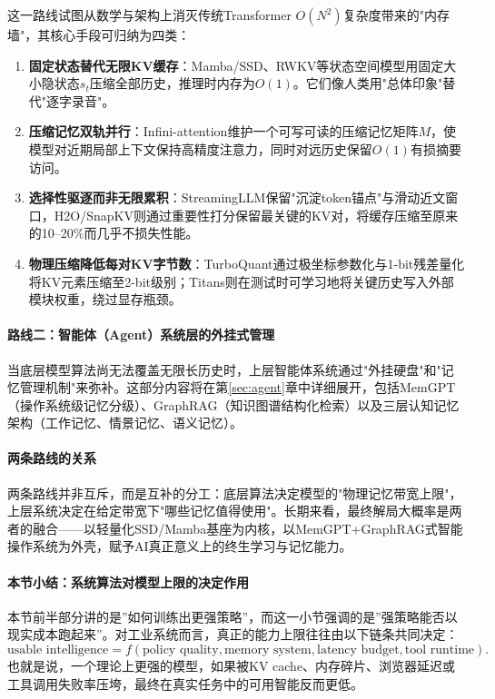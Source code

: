 \documentclass[12pt,a4paper]{article}
\begin{document}
这一路线试图从数学与架构上消灭传统Transformer $O(N^2)$复杂度带来的"内存墙"，其核心手段可归纳为四类：

\begin{enumerate}
    \item \textbf{固定状态替代无限KV缓存}：Mamba/SSD、RWKV等状态空间模型用固定大小隐状态$s_t$压缩全部历史，推理时内存为$O(1)$。它们像人类用"总体印象"替代"逐字录音"。
    \item \textbf{压缩记忆双轨并行}：Infini-attention维护一个可写可读的压缩记忆矩阵$M$，使模型对近期局部上下文保持高精度注意力，同时对远历史保留$O(1)$有损摘要访问。
    \item \textbf{选择性驱逐而非无限累积}：StreamingLLM保留"沉淀token锚点"与滑动近文窗口，H2O/SnapKV则通过重要性打分保留最关键的KV对，将缓存压缩至原来的10--20\%而几乎不损失性能。
    \item \textbf{物理压缩降低每对KV字节数}：TurboQuant通过极坐标参数化与1-bit残差量化将KV元素压缩至2-bit级别；Titans则在测试时可学习地将关键历史写入外部模块权重，绕过显存瓶颈。
\end{enumerate}

\paragraph{路线二：智能体（Agent）系统层的外挂式管理}

当底层模型算法尚无法覆盖无限长历史时，上层智能体系统通过"外挂硬盘"和"记忆管理机制"来弥补。这部分内容将在第\ref{sec:agent}章中详细展开，包括MemGPT（操作系统级记忆分级）、GraphRAG（知识图谱结构化检索）以及三层认知记忆架构（工作记忆、情景记忆、语义记忆）。

\paragraph{两条路线的关系}

两条路线并非互斥，而是互补的分工：底层算法决定模型的"物理记忆带宽上限"，上层系统决定在给定带宽下"哪些记忆值得使用"。长期来看，最终解局大概率是两者的融合——以轻量化SSD/Mamba基座为内核，以MemGPT+GraphRAG式智能操作系统为外壳，赋予AI真正意义上的终生学习与记忆能力。

\paragraph{本节小结：系统算法对模型上限的决定作用}

本节前半部分讲的是”如何训练出更强策略”，而这一小节强调的是”强策略能否以现实成本跑起来”。对工业系统而言，真正的能力上限往往由以下链条共同决定：
\begin{equation}
\text{usable intelligence} = f(\text{policy quality}, \text{memory system}, \text{latency budget}, \text{tool runtime}).
\end{equation}
也就是说，一个理论上更强的模型，如果被KV cache、内存碎片、浏览器延迟或工具调用失败率压垮，最终在真实任务中的可用智能反而更低。
\end{document}
